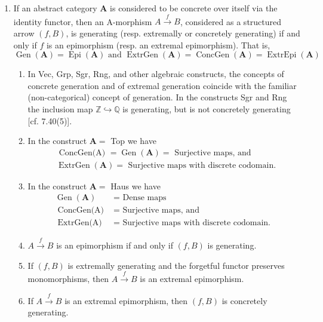 \begin{example}
\begin{example}
    \begin{enumerate}
        \item If an abstract category $\mathbf{A}$ is considered to be concrete over itself via the identity functor, then an A-morphism $A \xrightarrow{f} B$, considered as a structured arrow $(f, B)$, is generating (resp. extremally or concretely generating) if and only if $f$ is an epimorphism (resp. an extremal epimorphism). That is,
        $$
        \operatorname{Gen}(\mathbf{A})=\operatorname{Epi}(\mathbf{A}) \text { and } \operatorname{ExtrGen}(\mathbf{A})=\operatorname{ConcGen}(\mathbf{A})=\operatorname{ExtrEpi}(\mathbf{A})
        $$
        \begin{enumerate}
            \item In Vec, Grp, Sgr, Rng, and other algebraic constructs, the concepts of concrete generation and of extremal generation coincide with the familiar (non-categorical) concept of generation.
            In the constructs Sgr and Rng the inclusion map $\mathbb{Z} \hookrightarrow \mathbb{Q}$ is generating, but is not concretely generating [cf. 7.40(5)].

            \item In the construct $\mathbf{A}=$ Top we have
            $$
            \begin{aligned}
            & \text { ConcGen(A) }=\operatorname{Gen}(\mathbf{A})=\text { Surjective maps, and } \\
            & \operatorname{ExtrGen}(\mathbf{A})=\text { Surjective maps with discrete codomain. }
            \end{aligned}
            $$

            \item In the construct $\mathbf{A}=$ Haus we have
            $$
            \begin{aligned}
            \operatorname{Gen}(\mathbf{A}) & =\text { Dense maps } \\
            \text { ConcGen(A) } & =\text { Surjective maps, and } \\
            \text { ExtrGen(A) } & =\text { Surjective maps with discrete codomain. }
            \end{aligned}
            $$
        \item $A \xrightarrow{f} B$ is an epimorphism if and only if $(f, B)$ is generating.
\item If $(f, B)$ is extremally generating and the forgetful functor preserves monomorphisms, then $A \xrightarrow{f} B$ is an extremal epimorphism.
\item If $A \xrightarrow{f} B$ is an extremal epimorphism, then $(f, B)$ is concretely generating.    
        \end{enumerate}
    \end{enumerate}
\end{example}


\end{example}
